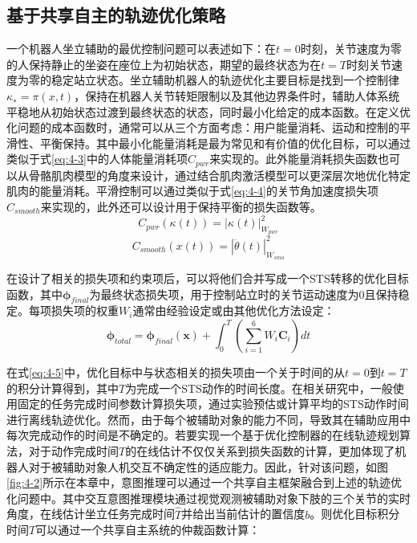 \subsection{基于共享自主的轨迹优化策略}
一个机器人坐立辅助的最优控制问题可以表述如下：在$t=0$时刻，关节速度为零的人保持静止的坐姿在座位上为初始状态，期望的最终状态为在$t=T$时刻关节速度为零的稳定站立状态。坐立辅助机器人的轨迹优化主要目标是找到一个控制律$\kappa_∗= π(x,t)$，保持在机器人关节转矩限制以及其他边界条件时，辅助人体系统平稳地从初始状态过渡到最终状态的状态，同时最小化给定的成本函数。在定义优化问题的成本函数时，通常可以从三个方面考虑：用户能量消耗、运动和控制的平滑性、平衡保持。其中最小化能量消耗是最为常见和有价值的优化目标，可以通过类似于式\ref{eq:4-3}中的人体能量消耗项$C_{pwr}$来实现的。此外能量消耗损失函数也可以从骨骼肌肉模型的角度来设计，通过结合肌肉激活模型可以更深层次地优化特定肌肉的能量消耗\cite{kumarPredictingSittoStandAdaptations2022}。平滑控制可以通过类似于式\ref{eq:4-4}的关节角加速度损失项$C_{smooth}$来实现的，此外还可以设计用于保持平衡的损失函数等。
\begin{equation}
    C_{pwr}(\kappa(t))=|\kappa(t)|_{W_{pwr}}^2
    \label{eq:4-3}
\end{equation}
\begin{equation}
    C_{smooth}(x(t))=|\dddot{\theta}(t)|_{W_{smo}}^2
    \label{eq:4-4}
\end{equation}

在设计了相关的损失项和约束项后，可以将他们合并写成一个STS转移的优化目标函数，其中$\boldsymbol{\phi}_{final}$为最终状态损失项，用于控制站立时的关节运动速度为0且保持稳定。每项损失项的权重$W_i$通常由经验设定或由其他优化方法设定：
\begin{equation}
    \boldsymbol{\phi}_{total}=\boldsymbol{\phi}_{final}(\boldsymbol{x})+\int_0^T\left(\sum_{i=1}^6 W_i \boldsymbol{C}_i\right) dt
    \label{eq:4-5}
\end{equation}

在式\ref{eq:4-5}中，优化目标中与状态相关的损失项由一个关于时间的从$t=0$到$t=T$的积分计算得到，其中$T$为完成一个STS动作的时间长度。在相关研究中，一般使用固定的任务完成时间参数计算损失项，通过实验预估或计算平均的STS动作时间进行离线轨迹优化。然而，由于每个被辅助对象的能力不同，导致其在辅助应用中每次完成动作的时间是不确定的。若要实现一个基于优化控制器的在线轨迹规划算法，对于动作完成时间$T$的在线估计不仅仅关系到损失函数的计算，更加体现了机器人对于被辅助对象人机交互不确定性的适应能力。因此，针对该问题，如图\ref{fig:4-2}所示在本章中，意图推理可以通过一个共享自主框架融合到上述的轨迹优化问题中。其中交互意图推理模块通过视觉观测被辅助对象下肢的三个关节的实时角度，在线估计坐立任务完成时间$\hat T$并给出当前估计的置信度$b$。则优化目标积分时间$T$可以通过一个共享自主系统的仲裁函数计算：

